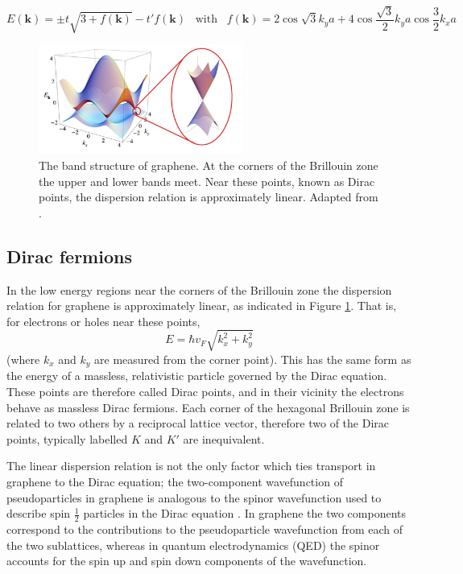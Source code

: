 \documentclass[edeposit,fullpage,draftthesis]{uiucthesis2009}
\begin{document}
    \begin{equation}
    E(\mathbf{k}) = \pm t \sqrt{3 + f(\mathbf{k})} - t' f(\mathbf{k}) \;\;\; \text{with} \;\;\; f(\mathbf{k}) = 2 \cos{\sqrt{3} k_y a } + 4 \cos{\frac{\sqrt{3}}{2} k_y a} \cos{\frac{3}{2} k_x a}
    \end{equation} 

    \begin{figure}
    \centering
    \includegraphics[width=0.6\textwidth]{images/background/ElecPropertiesFig3.png}
    \caption[The band structure of graphene]{The band structure of graphene. At the corners of the Brillouin zone the upper and lower bands meet. Near these points, known as Dirac points, the dispersion relation is approximately linear. Adapted from \cite{CastroNeto2009}.}
    \label{fig:bandstructure}
    \end{figure}


	\subsection{Dirac fermions}
    In the low energy regions near the corners of the Brillouin zone the dispersion relation for graphene is approximately linear, as indicated in Figure \ref{fig:bandstructure}. That is, for electrons or holes near these points,
    \begin{equation}
    E = \hbar v_F \sqrt{k_x^2 + k_y^2}
    \end{equation}
    (where $k_x$ and $k_y$ are measured from the corner point). This has the same form as the energy of a massless, relativistic particle governed by the Dirac equation. These points are therefore called Dirac points, and in their vicinity the electrons behave as massless Dirac fermions. Each corner of the hexagonal Brillouin zone is related to two others by a reciprocal lattice vector, therefore two of the Dirac points, typically labelled $K$ and $K'$ are inequivalent.

    The linear dispersion relation is not the only factor which ties transport in graphene to the Dirac equation; the two-component wavefunction of pseudoparticles in graphene is analogous to the spinor wavefunction used to describe spin $\frac{1}{2}$ particles in the Dirac equation \cite{Katsnelson2006}. In graphene the two components correspond to the contributions to the pseudoparticle wavefunction from each of the two sublattices, whereas in quantum electrodynamics (QED) the spinor accounts for the spin up and spin down components of the wavefunction.
\end{document}
